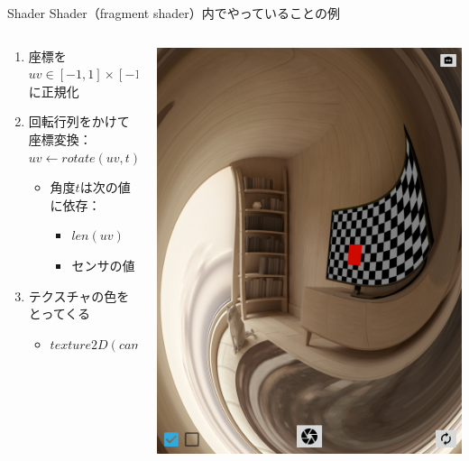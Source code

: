 \documentclass[dvipdfmx,12pt]{beamer}
\begin{document}
\begin{frame}{Shader}
  Shader（fragment shader）内でやっていることの例
  \begin{columns}[c]
    \begin{column}{0.7\linewidth}
      \begin{enumerate}
        \item 座標を$\textit{uv} \in [-1, 1] \times [-1, 1]$に正規化
        \item 回転行列をかけて座標変換：$\textit{uv} \leftarrow \textit{rotate}(\textit{uv}, t)$
        \begin{itemize}
          \item 角度$t$は次の値に依存：
          \begin{itemize}
            \item $\textit{len}(\textit{uv})$
            \item センサの値
          \end{itemize}
        \end{itemize}
        \item テクスチャの色をとってくる
        \begin{itemize}
          \item $\textit{texture2D}(\textit{camTexture}, \textit{uv} \cdot 0.5 + 0.5)$
        \end{itemize}
      \end{enumerate}
    \end{column}
    \begin{column}{0.3\linewidth}
      \begin{center}
        \includegraphics[width=\linewidth]{fig/screenshot.png}

\end{center}
\end{column}
\end{columns}
\end{frame}
\end{document}
